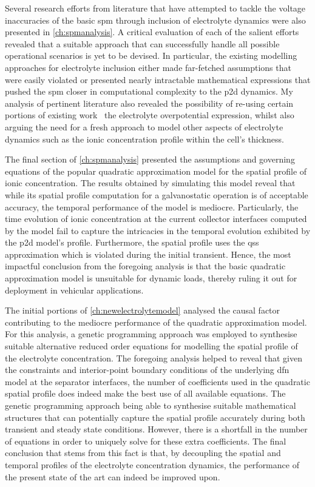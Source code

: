 Several  research efforts  from literature  that  have attempted  to tackle  the
voltage inaccuracies  of the  basic \gls{spm}  through inclusion  of electrolyte
dynamics were also presented in  \cref{ch:spmanalysis}. A critical evaluation of
each  of  the  salient  efforts  revealed that  a  suitable  approach  that  can
successfully handle all possible operational scenarios  is yet to be devised. In
particular, the  existing modelling approaches for  electrolyte inclusion either
made  far-fetched assumptions  that  were easily  violated  or presented  nearly
intractable  mathematical  expressions  that  pushed  the  \gls{spm}  closer  in
computational complexity  to the  \gls{p2d} dynamics.  My analysis  of pertinent
literature  also  revealed  the  possibility of  re-using  certain  portions  of
existing work \eg~the electrolyte  overpotential expression, whilst also arguing
the need  for a fresh  approach to model  other aspects of  electrolyte dynamics
such as the ionic concentration profile within the cell's thickness.

The  final  section  of  \cref{ch:spmanalysis}  presented  the  assumptions  and
governing equations of the popular quadratic approximation model for the spatial
profile of  ionic concentration. The  results obtained by simulating  this model
reveal that while its spatial  profile computation for a galvanostatic operation
is of  acceptable accuracy, the temporal  performance of the model  is mediocre.
Particularly, the time evolution of ionic concentration at the current collector
interfaces computed by the model fail to capture the intricacies in the temporal
evolution exhibited by  the \gls{p2d} model's profile.  Furthermore, the spatial
profile uses  the \gls{qss} approximation  which is violated during  the initial
transient. Hence, the  most impactful conclusion from the  foregoing analysis is
that the  basic quadratic approximation  model is unsuitable for  dynamic loads,
thereby ruling it out for deployment in vehicular applications.

The initial portions of \cref{ch:newelectrolytemodel} analysed the causal factor
contributing to the mediocre performance of the quadratic approximation model.
For this analysis, a genetic programming approach was employed to synthesise
suitable alternative reduced order equations for modelling the spatial profile
of the electrolyte concentration. The foregoing analysis helped to reveal that
given the constraints and interior-point boundary conditions of the underlying
\gls{dfn} model at the separator interfaces, the number of coefficients used in
the quadratic spatial profile does indeed make the best use of all available
equations. The genetic programming approach being able to synthesise suitable
mathematical structures that can potentially capture the spatial profile
accurately during both transient and steady state conditions. However, there is
a shortfall in the number of equations in order to uniquely solve for these
extra coefficients. The final conclusion that stems from this fact is that, by decoupling
the spatial and temporal profiles of the electrolyte concentration dynamics, the
performance of the present state of the art can indeed be improved upon.

